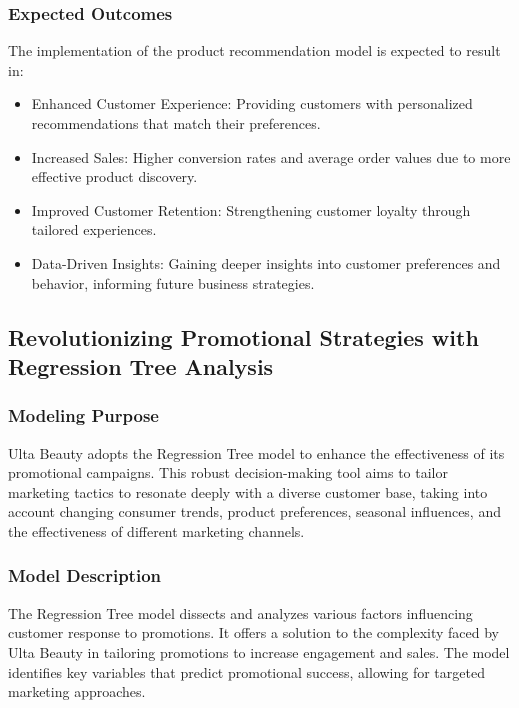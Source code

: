 \documentclass{article}
\begin{document}
\subsubsection{Expected Outcomes}
\label{sec:expected_outcomes}
The implementation of the product recommendation model is expected to result in:
\begin{itemize}
    \item Enhanced Customer Experience: Providing customers with personalized recommendations that match their preferences.
    \item Increased Sales: Higher conversion rates and average order values due to more effective product discovery.
    \item Improved Customer Retention: Strengthening customer loyalty through tailored experiences.
    \item Data-Driven Insights: Gaining deeper insights into customer preferences and behavior, informing future business strategies.
\end{itemize}
\subsection{Revolutionizing Promotional Strategies with Regression Tree Analysis}
\label{sec:regression_tree_analysis}

\subsubsection{Modeling Purpose}
\label{sec:modeling_purpose}
Ulta Beauty adopts the Regression Tree model to enhance the effectiveness of its promotional campaigns. This robust decision-making tool aims to tailor marketing tactics to resonate deeply with a diverse customer base, taking into account changing consumer trends, product preferences, seasonal influences, and the effectiveness of different marketing channels.

\subsubsection{Model Description}
\label{sec:model_description}
The Regression Tree model dissects and analyzes various factors influencing customer response to promotions. It offers a solution to the complexity faced by Ulta Beauty in tailoring promotions to increase engagement and sales. The model identifies key variables that predict promotional success, allowing for targeted marketing approaches.
\end{document}
